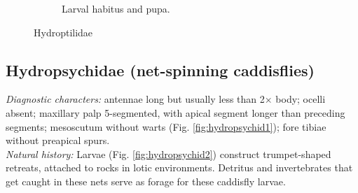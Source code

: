 \documentclass[letterpaper, 11pt]{article}
\begin{document}
\begin{figure}[ht!]
\begin{subfigure}[ht!]{0.3\textwidth}
        \caption{Larval habitus and pupa. \citep[Modified from Fig. 1372 in][]{bhlitem118010freshwater}}
        \label{fig:hydroptilid2}
    \end{subfigure}
    \caption{Hydroptilidae}\label{fig:hydroptilids}
\end{figure}

\subsection{Hydropsychidae (net-spinning caddisflies)}
\noindent{}\textit{Diagnostic characters:} antennae long but usually less than 2$\times$ body; ocelli absent; maxillary palp 5-segmented, with apical segment longer than preceding segments; mesoscutum without warts (Fig. \ref{fig:hydropsychid1}); fore tibiae without preapical spurs.\\

\noindent{}\textit{Natural history:} Larvae (Fig. \ref{fig:hydropsychid2}) construct trumpet-shaped retreats, attached to rocks in lotic environments. Detritus and invertebrates that get caught in these nets serve as forage for these caddisfly larvae. 
\end{document}
